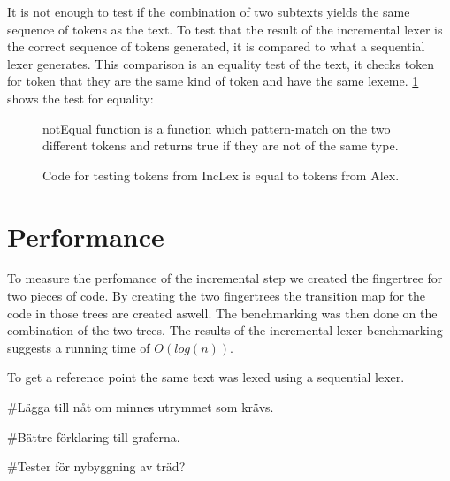 It is not enough to test if the combination of two subtexts yields the
same sequence of tokens as the text. To test that the result of the
incremental lexer is the correct sequence of tokens generated, it is compared to
what a sequential lexer generates. This comparison is an equality test of
the text, it checks token for token that they are the same kind of token and
have the same lexeme.
\cref{fig:CheckEquility} shows the test for equality:
\begin{figure}[h!]
  \centering
  
  notEqual function is a function which pattern-match on the two different
  tokens and returns true if they are not of the same type.
  \caption{Code for testing tokens from IncLex is equal to tokens from Alex. 
  \label{fig:CheckEquility}}
\end{figure} 

\section{Performance}
To measure the perfomance of the incremental step we created the fingertree for
two pieces of code. By creating the two fingertrees the transition map for the
code in those trees are created aswell. The benchmarking was then done on the
combination of the two trees. The results of the incremental lexer benchmarking
suggests a running time of $O(log(n))$.

To get a reference point the same text was lexed using a sequential lexer.

\#Lägga till nåt om minnes utrymmet som krävs.

\#Bättre förklaring till graferna.

\#Tester för nybyggning av träd?

